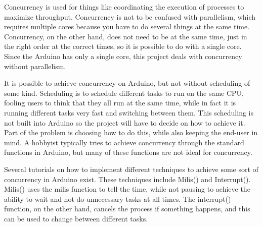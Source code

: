 Concurrency is used for things like coordinating the execution of processes to maximize throughput. Concurrency is not to be confused with parallelism, which requires multiple cores because you have to do several things at the same time. Concurrency, on the other hand, does not need to be at the same time, just in the right order at the correct times, so it is possible to do with a single core. Since the Arduino has only a single core, this project deals with concurrency without parallelism.

It is possible to achieve concurrency on Arduino, but not without scheduling of some kind. Scheduling is to schedule different tasks to run on the same CPU, fooling users to think that they all run at the same time, while in fact it is running different tasks very fast and switching between them. This scheduling is not built into Arduino so the project will have to decide on how to achieve it. Part of the problem is choosing how to do this, while also keeping the end-user in mind. A hobbyist typically tries to achieve concurrency through the standard functions in Arduino, but many of these functions are not ideal for concurrency.

Several tutorials on how to implement different techniques to achieve some sort of concurrency in Arduino exist. These techniques include Milis() and Interrupt(). Milis() uses the milis function to tell the time, while not pausing to achieve the ability to wait and not do unnecessary tasks at all times. The interrupt() function, on the other hand, cancels the process if something happens, and this can be used to change between different tasks.

